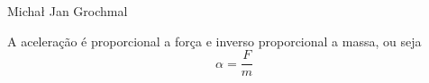 \documentclass[a4paper,12pt]{article}
\begin{document}
Micha\l{} Jan Grochmal

A acelera{\c c}{\~ a}o {\' e} proporcional a for{\c c}a e inverso proporcional
a massa, ou seja
\begin{equation}
\alpha = {\frac{F}{m}}
\label{a1}
\end{equation}
\end{document}
